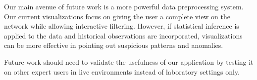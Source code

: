 Our main avenue of future work is a more powerful data preprocessing system. Our current visualizations focus on giving the user a complete view on the network while allowing interactive filtering. However, if statistical inference is applied to the data and historical observations are incorporated, visualizations can be more effective in pointing out suspicious patterns and anomalies.

Future work should need to validate the usefulness of our application by testing it on other expert users in live environments instead of laboratory settings only.
